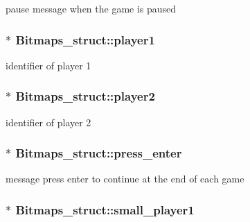 pause message when the game is paused 

\subsubsection[{\texorpdfstring{player1}{player1}}]{$\ast$ Bitmaps\+\_\+struct\+::player1}\hypertarget{group__graphics_ga279ac50f42320cb39cbc02270e40597a}{}\label{group__graphics_ga279ac50f42320cb39cbc02270e40597a}


identifier of player 1 

\subsubsection[{\texorpdfstring{player2}{player2}}]{$\ast$ Bitmaps\+\_\+struct\+::player2}\hypertarget{group__graphics_gaaee24419ba914b7d473d1f5e06d84272}{}\label{group__graphics_gaaee24419ba914b7d473d1f5e06d84272}


identifier of player 2 

\subsubsection[{\texorpdfstring{press\+\_\+enter}{press_enter}}]{$\ast$ Bitmaps\+\_\+struct\+::press\+\_\+enter}\hypertarget{group__graphics_gaf891e78c1cd9b89f53a3cf6032f88e71}{}\label{group__graphics_gaf891e78c1cd9b89f53a3cf6032f88e71}


message press enter to continue at the end of each game 

\subsubsection[{\texorpdfstring{small\+\_\+player1}{small_player1}}]{$\ast$ Bitmaps\+\_\+struct\+::small\+\_\+player1}\hypertarget{group__graphics_ga500b120fd59215d5436fe2121557d34a}{}\label{group__graphics_ga500b120fd59215d5436fe2121557d34a}
